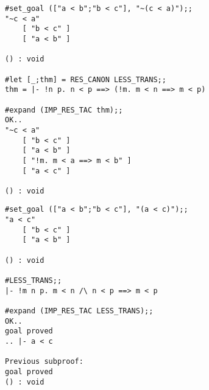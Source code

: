 
\vskip4mm
\begin{session}\begin{verbatim}
#set_goal (["a < b";"b < c"], "~(c < a)");;
"~c < a"
    [ "b < c" ]
    [ "a < b" ]

() : void

#let [_;thm] = RES_CANON LESS_TRANS;;
thm = |- !n p. n < p ==> (!m. m < n ==> m < p)

#expand (IMP_RES_TAC thm);;
OK..
"~c < a"
    [ "b < c" ]
    [ "a < b" ]
    [ "!m. m < a ==> m < b" ]
    [ "a < c" ]

() : void
\end{verbatim}\end{session}



\vskip4mm
\begin{session}\begin{verbatim}
#set_goal (["a < b";"b < c"], "(a < c)");;
"a < c"
    [ "b < c" ]
    [ "a < b" ]

() : void

#LESS_TRANS;;
|- !m n p. m < n /\ n < p ==> m < p

#expand (IMP_RES_TAC LESS_TRANS);;
OK..
goal proved
.. |- a < c

Previous subproof:
goal proved
() : void
\end{verbatim}\end{session}


